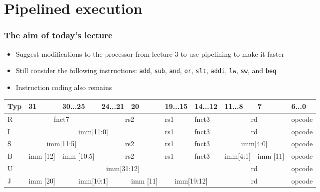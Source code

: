 \documentclass{beamer}
\subtitle{Lecture 05. Pipelined execution}
\author{Pavel Píša \phantom{xxxxxxx} Petr Štěpán \\ \small\texttt{pisa@fel.cvut.cz}\phantom{xxxx}\small\texttt{stepan@fel.cvut.cz}}
\begin{document}
\maketitle

\section{Pipelined execution}

\begin{frame}
\frametitle{The aim of today's lecture}

\begin{itemize}
 \item Suggest modifications to the processor from lecture 3 to use pipelining to make it faster
 \item Still consider the following instructions: \texttt{add}, \texttt{sub}, \texttt{and}, \texttt{or}, \texttt{slt}, \texttt{addi}, \texttt{lw}, \texttt{sw}, and \texttt{beq}
 \item Instruction coding also remains
\end{itemize}

\begin{table}
\footnotesize
\begin{tabular}{|m{0.4cm}|m{0.4cm}|m{1.0cm}|m{1.0cm}|m{0.4cm}|m{1.0cm}|m{1.0cm}|m{1.0cm}|m{0.4cm}|m{1.0cm}|}\hline
Typ & 31 & 30...25 & 24...21 & 20 & 19...15 & 14...12 & 11...8 & 7 & 6...0 \\ \hline
R & \multicolumn{2}{c|}{ fnct7 } & \multicolumn{2}{c|}{ rs2 } & rs1 & fnct3 &\multicolumn{2}{c|}{ rd } & opcode\\ \hline
I & \multicolumn{4}{c|}{ imm[11:0] } & rs1 & fnct3 &\multicolumn{2}{c|}{ rd } & opcode\\ \hline
S & \multicolumn{2}{c|}{ imm[11:5] } & \multicolumn{2}{c|}{ rs2 } & rs1 & fnct3 &\multicolumn{2}{c|}{ imm[4:0] } & opcode\\ \hline
B & imm [12] & imm [10:5]  & \multicolumn{2}{c|}{ rs2 } & rs1 & fnct3 & imm[4:1]& imm [11] & opcode\\ \hline
U & \multicolumn{6}{c|}{ imm[31:12] }  & \multicolumn{2}{c|}{ rd } & opcode\\ \hline
J & imm [20] & \multicolumn{2}{c|}{ imm[10:1] } & imm [11] & \multicolumn{2}{c|}{ imm[19:12] } & \multicolumn{2}{c|}{ rd } & opcode\\ \hline
\end{tabular}
\end{table}

\end{frame}
\end{document}
